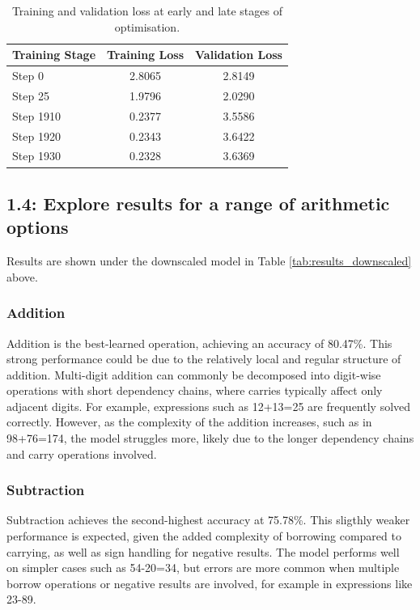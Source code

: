 \begin{table}[h]
\centering
\begin{tabular}{lcc}
\hline
\textbf{Training Stage} & \textbf{Training Loss} & \textbf{Validation Loss} \\
\hline
Step 0    & 2.8065 & 2.8149 \\
Step 25   & 1.9796 & 2.0290 \\
\hline
Step 1910 & 0.2377 & 3.5586 \\
Step 1920 & 0.2343 & 3.6422 \\
Step 1930 & 0.2328 & 3.6369 \\
\hline
\end{tabular}
\caption{Training and validation loss at early and late stages of optimisation.}
\label{tab:early_stopping}
\end{table}


\subsection{1.4: Explore results for a range of arithmetic options}

Results are shown under the downscaled model in Table \ref{tab:results_downscaled} above. 

\subsubsection{Addition}
Addition is the best-learned operation, achieving an accuracy of 80.47\%. This strong performance could be due to the relatively local and regular structure of addition. Multi-digit addition can commonly be decomposed into digit-wise operations with short dependency chains, where carries typically affect only adjacent digits. For example, expressions such as 12+13=25 are frequently solved correctly. However, as the complexity of the addition increases, such as in 98+76=174, the model struggles more, likely due to the longer dependency chains and carry operations involved.

\subsubsection{Subtraction}
Subtraction achieves the second-highest accuracy at 75.78\%. This sligthly weaker performance is expected, given the added complexity of borrowing compared to carrying, as well as sign handling for negative results. The model performs well on simpler cases such as 54-20=34, but errors are more common when multiple borrow operations or negative results are involved, for example in expressions like 23-89.

